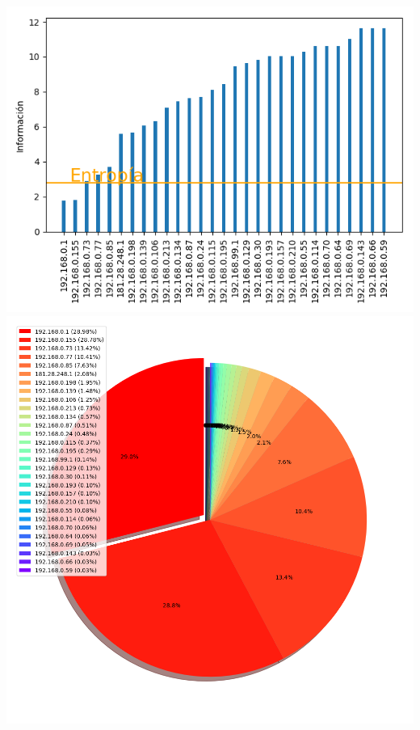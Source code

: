\hspace*{-1.5cm}
 \includegraphics[scale=0.6]{../plots/trabajo_s2_informacion.png}
 \includegraphics[scale=0.4]{../plots/trabajo_s2_probabilidades.png}


